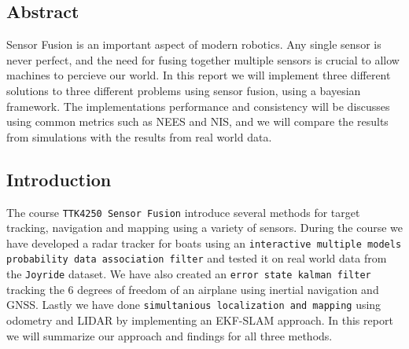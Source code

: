 \subsection{Abstract}
Sensor Fusion is an important aspect of modern robotics. Any single sensor is never perfect, and the need for fusing together multiple sensors is crucial to allow machines to percieve our world. In this report we will implement three different solutions to three different problems using sensor fusion, using a bayesian framework. The implementations performance and consistency will be discusses using common metrics such as NEES and NIS, and we will compare the results from simulations with the results from real world data. 
\subsection{Introduction}
The course \texttt{TTK4250 Sensor Fusion} introduce several methods for target tracking, navigation and mapping using a variety of sensors. During the course we have developed a radar tracker for boats using an \texttt{interactive multiple models probability data association filter} and tested it on real world data from the \texttt{Joyride} dataset. We have also created an \texttt{error state kalman filter} tracking the 6 degrees of freedom of an airplane using inertial navigation and GNSS. Lastly we have done \texttt{simultanious localization and mapping} using odometry and LIDAR by implementing an EKF-SLAM approach. In this report we will summarize our approach and findings for all three methods. 